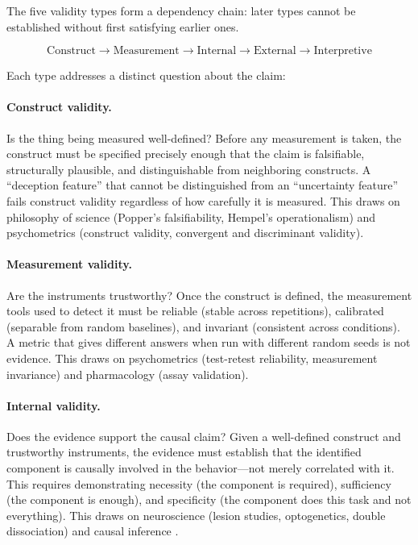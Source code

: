 \documentclass[10pt]{article}
\begin{document}
The five validity types form a dependency chain: later types cannot be established without first satisfying earlier ones.

\begin{equation}
\text{Construct} \rightarrow \text{Measurement} \rightarrow \text{Internal} \rightarrow \text{External} \rightarrow \text{Interpretive}
\label{eq:dependency}
\end{equation}

Each type addresses a distinct question about the claim:

\paragraph{Construct validity.} Is the thing being measured well-defined? Before any measurement is taken, the construct must be specified precisely enough that the claim is falsifiable, structurally plausible, and distinguishable from neighboring constructs. A ``deception feature'' that cannot be distinguished from an ``uncertainty feature'' fails construct validity regardless of how carefully it is measured. This draws on philosophy of science (Popper's falsifiability, Hempel's operationalism) and psychometrics (construct validity, convergent and discriminant validity).

\paragraph{Measurement validity.} Are the instruments trustworthy? Once the construct is defined, the measurement tools used to detect it must be reliable (stable across repetitions), calibrated (separable from random baselines), and invariant (consistent across conditions). A metric that gives different answers when run with different random seeds is not evidence. This draws on psychometrics (test-retest reliability, measurement invariance) and pharmacology (assay validation).

\paragraph{Internal validity.} Does the evidence support the causal claim? Given a well-defined construct and trustworthy instruments, the evidence must establish that the identified component is causally involved in the behavior---not merely correlated with it. This requires demonstrating necessity (the component is required), sufficiency (the component is enough), and specificity (the component does this task and not everything). This draws on neuroscience (lesion studies, optogenetics, double dissociation) and causal inference \citep{pearl2009causality}.
\end{document}

